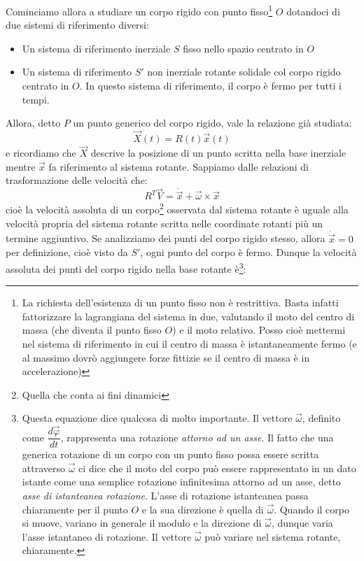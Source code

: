 \documentclass[a4paper,openany]{article}
\begin{document}
	
	Cominciamo allora a studiare un corpo rigido con punto fisso\footnote{La richiesta dell'esistenza di un punto fisso non è restrittiva. Basta infatti fattorizzare la lagrangiana del sistema in due, valutando il moto del centro di massa (che diventa il punto fisso $O$) e il moto relativo. Posso cioè mettermi nel sistema di riferimento in cui il centro di massa è istantaneamente fermo (e al massimo dovrò aggiungere forze fittizie se il centro di massa è in accelerazione)} $O$ dotandoci di due sistemi di riferimento diversi:
	\begin{itemize}
		\item Un sistema di riferimento inerziale $S$ fisso nello spazio centrato in $O$
		\item Un sistema di riferimento $S'$ non inerziale rotante solidale col corpo rigido centrato in $O$. In questo sistema di riferimento, il corpo è fermo per tutti i tempi.
	\end{itemize}
	Allora, detto $P$ un punto generico del corpo rigido, vale la relazione già studiata:
	$$
	\vec{X}(t) = R(t)\vec{x}(t)
	$$
	e ricordiamo che $\vec{X}$ descrive la posizione di un punto scritta nella base inerziale mentre $\vec{x}$ fa riferimento al sistema rotante. Sappiamo dalle relazioni di trasformazione delle velocità che:
	$$
	R^{T}\vec{V} = \dot{\vec{x}} +  \vec{\omega}\times\vec{x} 
	$$
	cioè la velocità assoluta di un corpo\footnote{Quella che conta ai fini dinamici} osservata dal sistema rotante è uguale alla velocità propria del sistema rotante scritta nelle coordinate rotanti più un termine aggiuntivo. Se analizziamo dei punti del corpo rigido stesso, allora $\dot{\vec{x}} = 0$ per definizione, cioè visto da $S'$, ogni punto del corpo è fermo. Dunque la velocità assoluta dei punti del corpo rigido nella base rotante è\footnote{Questa equazione dice qualcosa di molto importante. Il vettore $\vec{\omega}$, definito come $\dfrac{d\vec{\varphi}}{dt}$, rappresenta una rotazione \textit{attorno ad un asse}. Il fatto che una generica rotazione di un corpo con un punto fisso possa essere scritta attraverso $\vec{\omega}$ ci dice che il moto del corpo può essere rappresentato in un dato istante come una semplice rotazione infinitesima attorno ad un asse, detto \textit{asse di istanteanea rotazione}. L'asse di rotazione istanteanea passa chiaramente per il punto $O$ e la sua direzione è quella di $\vec{\omega}$. Quando il corpo si muove, variano in generale il modulo e la direzione di $\vec{\omega}$, dunque varia l'asse istantaneo di rotazione. Il vettore $\vec{\omega}$ può variare nel sistema rotante, chiaramente.}:
\end{document}
